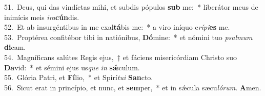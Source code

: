 {51.~}Deus, qui das vindíctas mihi, et subdis pópulos \textbf{sub} me:~* liberátor meus de inimícis meis \textit{i}\textit{ra}\textbf{cún}dis.\\
{52.~}Et ab insurgéntibus in me exal\textbf{tá}bis me:~* a viro iníquo e\textit{rí}\textit{pi}\textbf{es} me.\\
{53.~}Proptérea confitébor tibi in natiónibus, \textbf{Dó}mine:~* et nómini tuo \textit{psal}\textit{mum} \textbf{di}cam.\\
{54.~}Magníficans salútes Regis ejus,~† et fáciens misericórdiam Christo suo \textbf{Da}vid:~* et sémini ejus us\textit{que} \textit{in} \textbf{sǽ}culum.\\
{55.~}Glória Patri, et \textbf{Fí}lio,~* et Spirí\textit{tu}\textit{i} \textbf{San}cto.\\
{56.~}Sicut erat in princípio, et nunc, et \textbf{sem}per,~* et in sǽcula sæcu\textit{ló}\textit{rum}. \textbf{A}men.\\
